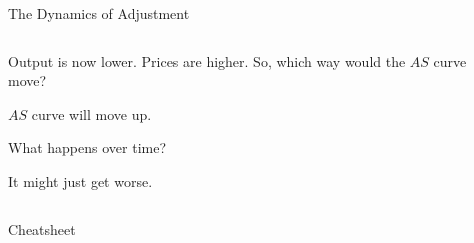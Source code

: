 \documentclass[shownotes,11pt, aspectratio=169]{beamer}
\newenvironment{wideitemize}{\itemize\addtolength{\itemsep}{10pt}}{\enditemize}
\begin{document}
\begin{frame}{The Dynamics of Adjustment}
\begin{columns}[T] %
\begin{column}{.44\textwidth}
  \begin{wideitemize}
    \item Output is now lower. Prices are higher. So, which way would the $AS$ curve move?
    \item $AS$ curve will move up.
    \item What happens over time? \pause
    \item It might just get worse.
  \end{wideitemize}
\end{column}%
\pause
\hfill%
\begin{column}{.53\textwidth}
\end{column}%
\end{columns}
\end{frame}

\begin{frame}{Cheatsheet}
\end{frame}
\end{document}
